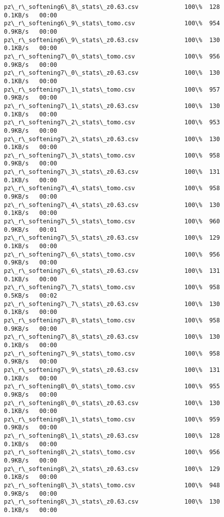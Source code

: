 \documentclass[11pt]{article}
\begin{document}
\begin{Verbatim}[commandchars=\\\{\}]
pz\_r\_softening6\_8\_stats\_z0.63.csv             100\%  128     0.1KB/s   00:00    
pz\_r\_softening6\_9\_stats\_tomo.csv              100\%  954     0.9KB/s   00:00    
pz\_r\_softening6\_9\_stats\_z0.63.csv             100\%  130     0.1KB/s   00:00    
pz\_r\_softening7\_0\_stats\_tomo.csv              100\%  956     0.9KB/s   00:00    
pz\_r\_softening7\_0\_stats\_z0.63.csv             100\%  130     0.1KB/s   00:00    
pz\_r\_softening7\_1\_stats\_tomo.csv              100\%  957     0.9KB/s   00:00    
pz\_r\_softening7\_1\_stats\_z0.63.csv             100\%  130     0.1KB/s   00:00    
pz\_r\_softening7\_2\_stats\_tomo.csv              100\%  953     0.9KB/s   00:00    
pz\_r\_softening7\_2\_stats\_z0.63.csv             100\%  130     0.1KB/s   00:00    
pz\_r\_softening7\_3\_stats\_tomo.csv              100\%  958     0.9KB/s   00:00    
pz\_r\_softening7\_3\_stats\_z0.63.csv             100\%  131     0.1KB/s   00:00    
pz\_r\_softening7\_4\_stats\_tomo.csv              100\%  958     0.9KB/s   00:00    
pz\_r\_softening7\_4\_stats\_z0.63.csv             100\%  130     0.1KB/s   00:00    
pz\_r\_softening7\_5\_stats\_tomo.csv              100\%  960     0.9KB/s   00:01    
pz\_r\_softening7\_5\_stats\_z0.63.csv             100\%  129     0.1KB/s   00:00    
pz\_r\_softening7\_6\_stats\_tomo.csv              100\%  956     0.9KB/s   00:00    
pz\_r\_softening7\_6\_stats\_z0.63.csv             100\%  131     0.1KB/s   00:00    
pz\_r\_softening7\_7\_stats\_tomo.csv              100\%  958     0.5KB/s   00:02    
pz\_r\_softening7\_7\_stats\_z0.63.csv             100\%  130     0.1KB/s   00:00    
pz\_r\_softening7\_8\_stats\_tomo.csv              100\%  958     0.9KB/s   00:00    
pz\_r\_softening7\_8\_stats\_z0.63.csv             100\%  130     0.1KB/s   00:00    
pz\_r\_softening7\_9\_stats\_tomo.csv              100\%  958     0.9KB/s   00:00    
pz\_r\_softening7\_9\_stats\_z0.63.csv             100\%  131     0.1KB/s   00:00    
pz\_r\_softening8\_0\_stats\_tomo.csv              100\%  955     0.9KB/s   00:00    
pz\_r\_softening8\_0\_stats\_z0.63.csv             100\%  130     0.1KB/s   00:00    
pz\_r\_softening8\_1\_stats\_tomo.csv              100\%  959     0.9KB/s   00:00    
pz\_r\_softening8\_1\_stats\_z0.63.csv             100\%  128     0.1KB/s   00:00    
pz\_r\_softening8\_2\_stats\_tomo.csv              100\%  956     0.9KB/s   00:00    
pz\_r\_softening8\_2\_stats\_z0.63.csv             100\%  129     0.1KB/s   00:00    
pz\_r\_softening8\_3\_stats\_tomo.csv              100\%  948     0.9KB/s   00:00    
pz\_r\_softening8\_3\_stats\_z0.63.csv             100\%  130     0.1KB/s   00:00    

\end{Verbatim}
\end{document}
